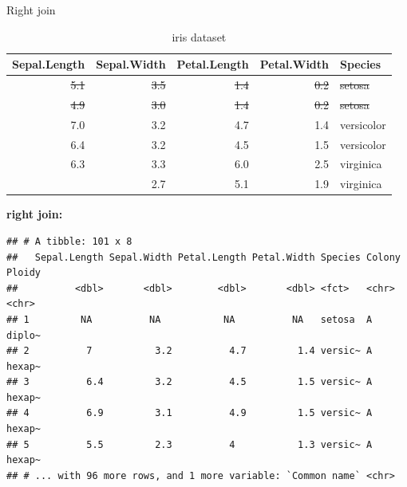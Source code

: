 \documentclass[14pt,ignorenonframetext,]{bredelebeamer}
\newenvironment{Shaded}{\begin{snugshade}}{\end{snugshade}}
\newcommand{\KeywordTok}[1]{\textcolor[rgb]{0.94,0.87,0.69}{#1}}
\newcommand{\DataTypeTok}[1]{\textcolor[rgb]{0.87,0.87,0.75}{#1}}
\newcommand{\DecValTok}[1]{\textcolor[rgb]{0.86,0.86,0.80}{#1}}
\newcommand{\StringTok}[1]{\textcolor[rgb]{0.80,0.58,0.58}{#1}}
\newcommand{\OperatorTok}[1]{\textcolor[rgb]{0.94,0.94,0.82}{#1}}
\newcommand{\NormalTok}[1]{\textcolor[rgb]{0.80,0.80,0.80}{#1}}
\begin{document}
\begin{frame}[fragile]{Right join}

\small

\begin{table}[t]

\caption{\label{tab:unnamed-chunk-49}iris dataset}
\centering
\begin{tabular}{rrrrl}
\toprule
Sepal.Length & Sepal.Width & Petal.Length & Petal.Width & Species\\
\midrule
\rowcolor{gray!6}  \sout{5.1} & \sout{3.5} & \sout{1.4} & \sout{0.2} & \sout{setosa}\\
\sout{4.9} & \sout{3.0} & \sout{1.4} & \sout{0.2} & \sout{setosa}\\
\rowcolor{gray!6}  7.0 & 3.2 & 4.7 & 1.4 & versicolor\\
6.4 & 3.2 & 4.5 & 1.5 & versicolor\\
\rowcolor{gray!6}  6.3 & 3.3 & 6.0 & 2.5 & virginica\\
\addlinespace
5.8 & 2.7 & 5.1 & 1.9 & virginica\\
\bottomrule
\end{tabular}
\end{table}

\textbf{right join:}

\begin{Shaded}
\end{Shaded}

\begin{verbatim}
## # A tibble: 101 x 8
##   Sepal.Length Sepal.Width Petal.Length Petal.Width Species Colony Ploidy
##          <dbl>       <dbl>        <dbl>       <dbl> <fct>   <chr>  <chr> 
## 1         NA          NA           NA          NA   setosa  A      diplo~
## 2          7           3.2          4.7         1.4 versic~ A      hexap~
## 3          6.4         3.2          4.5         1.5 versic~ A      hexap~
## 4          6.9         3.1          4.9         1.5 versic~ A      hexap~
## 5          5.5         2.3          4           1.3 versic~ A      hexap~
## # ... with 96 more rows, and 1 more variable: `Common name` <chr>
\end{verbatim}

\end{frame}
\end{document}
